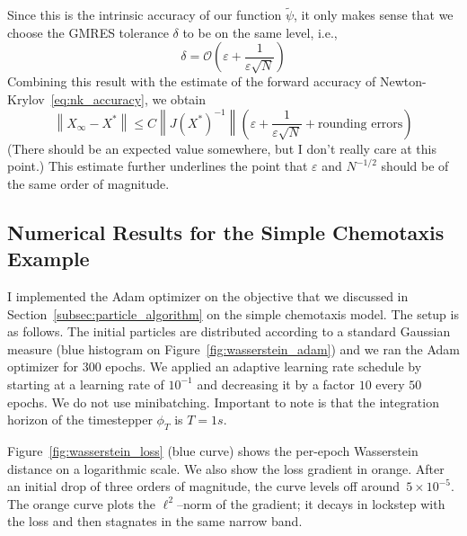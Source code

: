 \documentclass{article}
\newcommand{\norm}[1]{\left\lVert #1 \right\rVert}
\begin{document}
Since this is the intrinsic accuracy of our function $\tilde{\psi}$, it only makes sense that we choose the GMRES tolerance $\delta$ to be on the same level, i.e., 
\begin{equation}
    \delta = \mathcal{O}\left(\varepsilon + \frac{1}{\varepsilon \sqrt{N}}\right)
\end{equation}
Combining this result with the estimate of the forward accuracy of Newton-Krylov~\eqref{eq:nk_accuracy}, we obtain
\begin{equation}
    \norm{X_{\infty} - X^*} \leq C \norm{J(X^*)^{-1}} \left( 
 \varepsilon + \frac{1}{\varepsilon \sqrt{N}} + \text{rounding errors}\right)
\end{equation}
(There should be an expected value somewhere, but I don't really care at this point.) This estimate further underlines the point that $\varepsilon$ and $N^{-1/2}$ should be of the same order of magnitude.

\subsection{Numerical Results for the Simple Chemotaxis Example}
I implemented the Adam optimizer on the objective that we discussed in Section~\ref{subsec:particle_algorithm} on the simple chemotaxis model. The setup is as follows. The initial particles are distributed according to a standard Gaussian measure (blue histogram on Figure~\ref{fig:wasserstein_adam}) and we ran the Adam optimizer for 300 epochs. We applied an adaptive learning rate schedule by starting at a learning rate of $10^{-1}$ and decreasing it by a factor $10$ every $50$ epochs. We do not use minibatching. Important to note is that the integration horizon of the timestepper $\phi_T$ is $T = 1s$.

Figure~\ref{fig:wasserstein_loss} (blue curve) shows the per-epoch Wasserstein distance on a logarithmic scale. We also show the loss gradient in orange. After an initial drop of three orders of magnitude, the curve levels off around~$5\times10^{-5}$. The orange curve plots the $\ell^{2}$–norm of the gradient; it decays in lockstep with the loss and then stagnates in the same narrow band.
\end{document}
